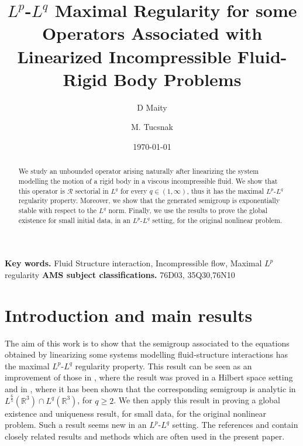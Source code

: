 \documentclass[12pt,a4paper,reqno]{amsart}
\theoremstyle{definition}
\theoremstyle{remark}
\numberwithin{equation}{section}
\newcommand{\mr}{\mathcal{R}}
\begin{document}
\title[]{ $L^p$-$L^q$ Maximal Regularity for some Operators  Associated with Linearized  Incompressible Fluid-Rigid Body Problems}

 \date{\today}

\author{D Maity}
\address{Institut de Math\'ematiques, Universit\'e de Bordeaux, Bordeaux INP, CNRS
F-33400 Talence, France}
\author{M. Tucsnak}
\address{Institut de Math\'ematiques, Universit\'e de Bordeaux, Bordeaux INP, CNRS
F-33400 Talence, France}




\begin{abstract}
We study an unbounded operator arising naturally after linearizing the system modelling the motion of a rigid body in a viscous incompressible fluid. We show that this operator is $\mr$ sectorial in $L^q$ for every $q\in (1,\infty)$, thus it has the maximal $L^p$-$L^q$ regularity property. Moreover, we show that the generated semigroup is exponentially stable with respect to the $L^q$ norm. Finally, we use the results to prove the global existence for small initial data, in an $L^p$-$L^q$ setting, for the original nonlinear problem.
\end{abstract}

\maketitle

 {\bf Key words.} Fluid Structure interaction, Incompressible flow, Maximal $L^{p}$ regularity
%
 {\bf AMS subject classifications.} 76D03, 35Q30,76N10






\section{Introduction and main results}\label{sec_intro}


The aim of this work is to show that the semigroup associated to the equations obtained  by linearizing some systems modelling fluid-structure interactions has the maximal $L^p$-$L^q$ regularity property. This result can be seen as an improvement of those in \cite{TT1,TT2}, where the result was proved in a Hilbert space setting and in \cite{WX11}, where it has been shown that the corresponding semigroup is analytic in $L^{\frac 65}(\mathbb{R}^3)\cap L^q(\mathbb{R}^3)$, for $q\geqslant 2$. We then apply this result in proving a global existence and uniqueness result, for small data, for the
original nonlinear problem. Such a result seems new in an  $L^p$-$L^q$ setting. The references \cite{TT1,TT2} and \cite{Gei13} contain closely related results  and methods which are often used in  the present paper.
\end{document}
